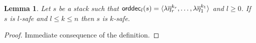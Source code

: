 \documentclass[a4paper]{article}[12pt]
\newtheorem{lemma}{Lemma}[section]
\theoremstyle{remark}
\theoremstyle{definition}
\newcommand\orddec{{\sf orddec}}
\begin{document}
%
%

\begin{lemma}
\label{lem:stacksafety_immediate results}
Let $s$ be a stack such that $\orddec_l(s) = \langle \lambda \overline\eta_r^{k_r}, \ldots, \lambda \overline{\eta}_1^{k_1} \rangle$ and $l\geq 0$.
If $s$ is $l$-safe and $l \leq k \leq n$ then $s$ is $k$-safe.
\end{lemma}
\begin{proof}
Immediate consequence of the definition.
\end{proof}
\end{document}
